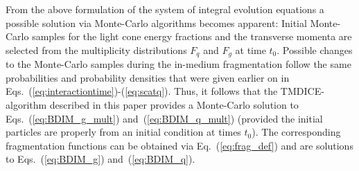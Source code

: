 \documentclass[preprint,12pt]{elsarticle}
\newcommand{\tmdice}{{\sf TMDICE}}
\begin{document}
From the above formulation of the system of integral evolution equations a possible solution via Monte-Carlo algorithms becomes apparent: 
Initial Monte-Carlo samples for the light cone energy fractions and the transverse momenta are selected from the multiplicity distributions $F_q$ and $F_g$ at time $t_0$. 
Possible changes to the Monte-Carlo samples during the in-medium fragmentation 
follow the same probabilities and probability densities that were given earlier on in Eqs.~(\ref{eq:interactiontime})-(\ref{eq:scatq}).
Thus, it follows that the \tmdice-algorithm described in this paper provides a Monte-Carlo solution to Eqs.~(\ref{eq:BDIM_g_mult}) and~(\ref{eq:BDIM_q_mult}) (provided the initial particles are properly from an initial condition at times $t_0$).
The corresponding fragmentation functions can be obtained via Eq.~(\ref{eq:frag_def}) and are solutions to Eqs.~(\ref{eq:BDIM_g}) and~(\ref{eq:BDIM_q}).
\end{document}
